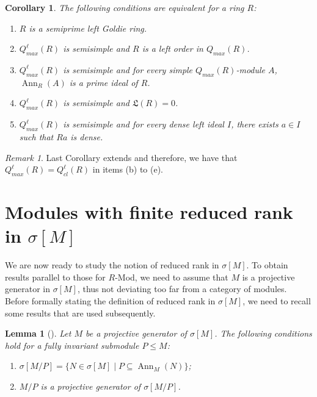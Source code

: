 \documentclass{amsart}
\newtheorem{lemma}[thm]{Lemma}
\newtheorem{cor}[thm]{Corollary}
\theoremstyle{definition}
\theoremstyle{remark}
\newtheorem{rem}[thm]{Remark}
\numberwithin{equation}{section}
\DeclareMathOperator{\Ann}{Ann}
\newcommand{\sm}{\sigma[M]}
\begin{document}
	\begin{cor}\label{qmax}
		The following conditions are equivalent for a ring $R$:
		\begin{enumerate}[label=\emph{(\alph*)}]
			\item $R$ is a semiprime left Goldie ring.
			
			\item $Q_{max}^\ell(R)$ is semisimple and $R$ is a left order in $Q_{max}(R)$. 
			
			\item $Q_{max}^\ell(R)$ is semisimple and for every simple $Q_{max}(R)$-module $A$, $\Ann_R(A)$ is a prime ideal of $R$.
			
			\item $Q_{max}^\ell(R)$ is semisimple and $\mathfrak{L}(R)=0$.
			
			\item $Q_{max}^\ell(R)$ is semisimple and for every dense left ideal $I$, there exists $a\in I$ such that $Ra$ is dense.
		\end{enumerate} 
	\end{cor}
	
	\begin{rem}
		Last Corollary extends \cite[13.40 and 13.41]{lamlectures} and therefore, we have that $Q_{max}^\ell(R)=Q_{cl}^\ell(R)$ in items (b) to (e).
	\end{rem}
	
	\section{Modules with finite reduced rank in $\sm$}\label{mfrr}
	
	We are now ready to study the notion of reduced rank in $\sigma [M]$.
	To obtain results parallel to those for $R$-Mod,
	we need to assume that $M$ is a projective generator in $\sigma [M]$,
	thus not deviating too far from a category of modules.
	Before formally stating the definition of reduced rank in $\sigma [M]$,
	we need to recall some results that are used subsequently.
	
	\begin{lemma}[{\cite[Proposition 1.5]{PepeFbn}}]\label{genq}
		Let $M$ be a projective generator of $\sm$. 
		The following conditions hold for a fully invariant submodule $P\leq M$:
		\begin{enumerate}
			\item $\sigma[M/P]=\{N\in\sm\mid P\subseteq \Ann_M(N)\}$;
			\item $M/P$ is a projective generator of $\sigma[M/P]$.
		\end{enumerate}
	\end{lemma}
	
\end{document}
